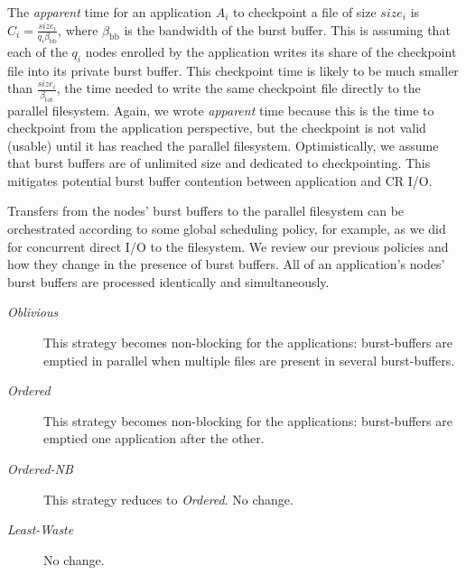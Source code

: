 \documentclass[two]{article}
\newcommand{\bandtotal}{\beta_{\text{tot}}}
\newcommand{\app}[1]{A_{#1}}
\newcommand{\nbnodes}[1]{q_{#1}}
\newcommand{\ckpt}[1]{C_{#1}}
\newcommand{\size}[1]{\mathit{size}_{#1}}
\newcommand{\nocoop}{\emph{Oblivious}\xspace}
\newcommand{\fifoblock}{\emph{Ordered}\xspace}
\newcommand{\fifononblock}{\emph{Ordered-NB}\xspace}
\newcommand{\leastwaste}{\emph{Least-Waste}\xspace}
\newcommand{\bwbb}{\beta_{\text{bb}}}
\begin{document}
The \emph{apparent} time for an application $\app{i}$ to checkpoint a file of size
$\size{i}$ is $\ckpt{i} = \frac{\size{i}}{\nbnodes{i} \bwbb}$, where $\bwbb$ is the
bandwidth of the burst buffer. This is assuming that each of the $\nbnodes{i}$ nodes
enrolled by the application writes its share of the checkpoint file into its private
burst buffer. This checkpoint time is likely to be much smaller than
$\frac{\size{i}}{\bandtotal}$, the time needed to write the same checkpoint file
directly to the parallel filesystem.  Again, we wrote \emph{apparent} time because
this is the time to checkpoint from the application perspective, but the checkpoint
is not valid (usable) until it has reached the parallel filesystem.
Optimistically, we assume that burst buffers are of unlimited size and dedicated to
checkpointing. This mitigates potential burst buffer contention between application
and CR I/O.
 
Transfers from the nodes' burst buffers to the parallel
filesystem can be orchestrated according to some global scheduling
policy, for example, as we did for concurrent direct I/O to the
filesystem. We review our previous policies and how they change in 
the presence of burst buffers. 
All of an application's nodes' burst buffers are processed identically and
simultaneously.

\begin{description}

\item[\nocoop] This strategy becomes non-blocking for the applications: burst-buffers
  are emptied in parallel when multiple files are present in several burst-buffers.
\item[\fifoblock] This strategy becomes non-blocking for the applications:
  burst-buffers are emptied one application after the other.
\item[\fifononblock] This strategy reduces to \fifoblock. No change.
\item[\leastwaste] No change.
\end{description}

\end{document}
